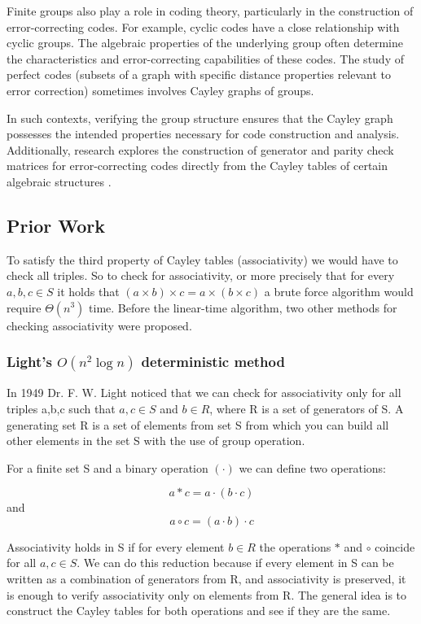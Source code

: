\documentclass[sigconf]{acmart}
\begin{document}
Finite groups also play a role in coding theory, particularly in the construction of error-correcting codes. For example, cyclic codes have a close 
relationship with cyclic groups. The algebraic properties of the underlying group often determine the characteristics and error-correcting
capabilities of these codes. The study of perfect codes (subsets of a graph with specific distance properties relevant to error correction)
sometimes involves Cayley graphs of groups.

In such contexts, verifying the group structure ensures that the Cayley graph possesses
the intended properties necessary for code construction and analysis. Additionally, research explores the construction of generator
and parity check matrices for error-correcting codes directly from the Cayley tables of certain algebraic structures \cite{zurekCodingTheory}.

\subsection{Prior Work}
To satisfy the third property of Cayley tables (associativity) we would have to check all triples. So to check for associativity, or more precisely that for every \(a,b,c  \in S\) it holds that \((a\times b)\times c = a\times (b\times c)\) a brute force algorithm would require \(\Theta(n^3)\) time. Before the linear-time algorithm, two other methods for checking associativity were proposed.
\subsubsection{Light's \( O(n^2 \log n) \) deterministic method}
In 1949 Dr. F. W. Light noticed that we can check for associativity only for all triples a,b,c such that \(a,c \in S\) and \(b\in R\), where R is a set of generators of S. A generating set R is a set of elements from set S from which you can build all other elements in the set S with the use of group operation. 

For a finite set S and a binary operation \((\cdot)\) we can define two operations:

\[a * c = a\cdot(b\cdot c)\] and
\[a \circ c= (a\cdot b)\cdot c\]

Associativity holds in S if for every element \(b \in R\) the operations \(*\) and \(\circ\) coincide for all \(a,c \in S\). We can do this reduction because if every element in S can be written as a combination of generators from R, and associativity is preserved, it is enough to verify associativity only on elements from R.
The general idea is to construct the Cayley tables for both operations and see if they are the same.
\end{document}
